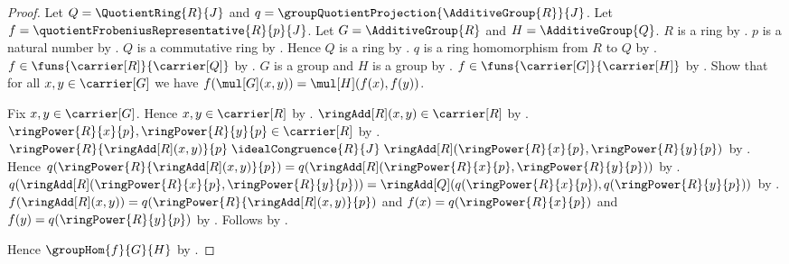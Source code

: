 \begin{proof}
    Let $Q=\QuotientRing{R}{J}$ and
        $q=\groupQuotientProjection{\AdditiveGroup{R}}{J}$.
    Let $f=\quotientFrobeniusRepresentative{R}{p}{J}$.
    Let $G=\AdditiveGroup{R}$ and $H=\AdditiveGroup{Q}$.
    $R$ is a ring by .
    $p$ is a natural number by .
    $Q$ is a commutative ring by
        .
    Hence $Q$ is a ring by .
    $q$ is a ring homomorphism from $R$ to $Q$ by
        .
    $f\in\funs{\carrier[R]}{\carrier[Q]}$ by
        .
    $G$ is a group and $H$ is a group by
        .
    $f\in\funs{\carrier[G]}{\carrier[H]}$ by
        .
    Show that for all $x,y\in\carrier[G]$ we have
        $f(\mul[G](x,y))=\mul[H](f(x),f(y))$.
    \begin{subproof}
        Fix $x,y\in\carrier[G]$.
        Hence $x,y\in\carrier[R]$ by
            .
        $\ringAdd[R](x,y)\in\carrier[R]$ by .
        $\ringPower{R}{x}{p},\ringPower{R}{y}{p}\in\carrier[R]$ by
            .
        $\ringPower{R}{\ringAdd[R](x,y)}{p}
            \mathrel{\idealCongruence{R}{J}}
            \ringAdd[R](\ringPower{R}{x}{p},\ringPower{R}{y}{p})$ by
            .
        Hence
            $q(\ringPower{R}{\ringAdd[R](x,y)}{p})
                =q(\ringAdd[R](
                    \ringPower{R}{x}{p},\ringPower{R}{y}{p}))$ by
            .
        $q(\ringAdd[R](\ringPower{R}{x}{p},\ringPower{R}{y}{p}))
            =\ringAdd[Q](q(\ringPower{R}{x}{p}),
                q(\ringPower{R}{y}{p}))$ by
            .
        $f(\ringAdd[R](x,y))
            =q(\ringPower{R}{\ringAdd[R](x,y)}{p})$ and
            $f(x)=q(\ringPower{R}{x}{p})$ and
            $f(y)=q(\ringPower{R}{y}{p})$ by
            .
        Follows by .
    \end{subproof}
    Hence $\groupHom{f}{G}{H}$ by .


\end{proof}
